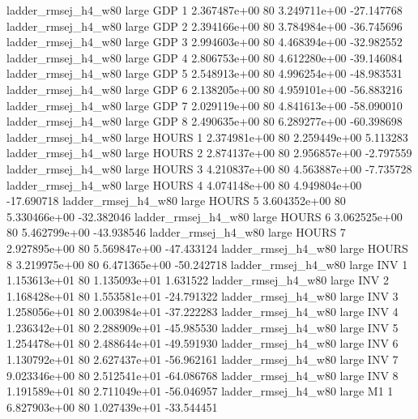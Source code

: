 ladder_rmsej_h4_w80      large      GDP                 1 2.367487e+00 80   3.249711e+00         -27.147768
ladder_rmsej_h4_w80      large      GDP                 2 2.394166e+00 80   3.784984e+00         -36.745696
ladder_rmsej_h4_w80      large      GDP                 3 2.994603e+00 80   4.468394e+00         -32.982552
ladder_rmsej_h4_w80      large      GDP                 4 2.806753e+00 80   4.612280e+00         -39.146084
ladder_rmsej_h4_w80      large      GDP                 5 2.548913e+00 80   4.996254e+00         -48.983531
ladder_rmsej_h4_w80      large      GDP                 6 2.138205e+00 80   4.959101e+00         -56.883216
ladder_rmsej_h4_w80      large      GDP                 7 2.029119e+00 80   4.841613e+00         -58.090010
ladder_rmsej_h4_w80      large      GDP                 8 2.490635e+00 80   6.289277e+00         -60.398698
ladder_rmsej_h4_w80      large    HOURS                 1 2.374981e+00 80   2.259449e+00           5.113283
ladder_rmsej_h4_w80      large    HOURS                 2 2.874137e+00 80   2.956857e+00          -2.797559
ladder_rmsej_h4_w80      large    HOURS                 3 4.210837e+00 80   4.563887e+00          -7.735728
ladder_rmsej_h4_w80      large    HOURS                 4 4.074148e+00 80   4.949804e+00         -17.690718
ladder_rmsej_h4_w80      large    HOURS                 5 3.604352e+00 80   5.330466e+00         -32.382046
ladder_rmsej_h4_w80      large    HOURS                 6 3.062525e+00 80   5.462799e+00         -43.938546
ladder_rmsej_h4_w80      large    HOURS                 7 2.927895e+00 80   5.569847e+00         -47.433124
ladder_rmsej_h4_w80      large    HOURS                 8 3.219975e+00 80   6.471365e+00         -50.242718
ladder_rmsej_h4_w80      large      INV                 1 1.153613e+01 80   1.135093e+01           1.631522
ladder_rmsej_h4_w80      large      INV                 2 1.168428e+01 80   1.553581e+01         -24.791322
ladder_rmsej_h4_w80      large      INV                 3 1.258056e+01 80   2.003984e+01         -37.222283
ladder_rmsej_h4_w80      large      INV                 4 1.236342e+01 80   2.288909e+01         -45.985530
ladder_rmsej_h4_w80      large      INV                 5 1.254478e+01 80   2.488644e+01         -49.591930
ladder_rmsej_h4_w80      large      INV                 6 1.130792e+01 80   2.627437e+01         -56.962161
ladder_rmsej_h4_w80      large      INV                 7 9.023346e+00 80   2.512541e+01         -64.086768
ladder_rmsej_h4_w80      large      INV                 8 1.191589e+01 80   2.711049e+01         -56.046957
ladder_rmsej_h4_w80      large       M1                 1 6.827903e+00 80   1.027439e+01         -33.544451
